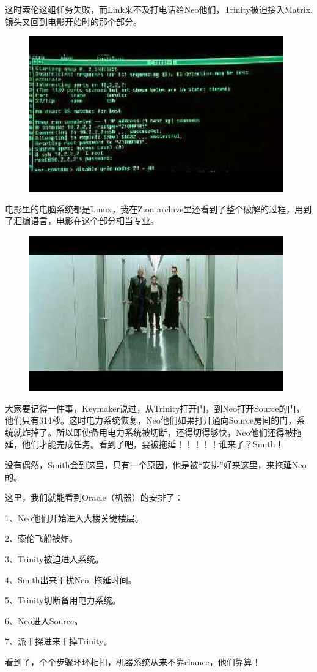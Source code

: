 \documentclass{ctexart}
\begin{document}
这时索伦这组任务失败，而Link来不及打电话给Neo他们，Trinity被迫接入Matrix. 镜头又回到电影开始时的那个部分。

\begin{figure}[htb]
\centering
\includegraphics[width=0.5\linewidth]{fig/read_reloaded-151}
\end{figure}

电影里的电脑系统都是Linux，我在Zion archive里还看到了整个破解的过程，用到了汇编语言，电影在这个部分相当专业。

\begin{figure}[htb]
\centering
\includegraphics[width=0.5\linewidth]{fig/read_reloaded-152}
\end{figure}

大家要记得一件事，Keymaker说过，从Trinity打开门，到Neo打开Source的门，他们只有314秒。这时电力系统恢复，Neo他们如果打开通向Source房间的门，系统就炸掉了。所以即使备用电力系统被切断，还得切得够快，Neo他们还得被拖延，他们才能完成任务。看到了吧，要被拖延！！！！！谁来了？Smith！

没有偶然，Smith会到这里，只有一个原因，他是被“安排”好来这里，来拖延Neo的。

这里，我们就能看到Oracle（机器）的安排了：

1、Neo他们开始进入大楼关键楼层。

2、索伦飞船被炸。

3、Trinity被迫进入系统。

4、Smith出来干扰Neo, 拖延时间。

5、Trinity切断备用电力系统。

6、Neo进入Source。

7、派干探进来干掉Trinity。

看到了，个个步骤环环相扣，机器系统从来不靠chance，他们靠算！
\end{document}
